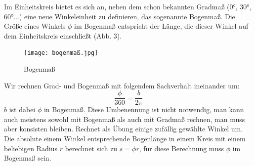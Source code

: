 \documentclass[11pt]{article}
\begin{document}
Im Einheitskreis bietet es sich an, neben dem schon bekannten Gradmaß (0°, 30°, 60°...) eine neue Winkeleinheit zu definieren, das sogenannte Bogenmaß. Die Größe eines Winkels $\phi$ im Bogenmaß entspricht der Länge, die dieser Winkel auf dem Einheitskreis einschließt (Abb. 3). 
\begin{figure}[ht]
    \texttt{[image: bogenmaß.jpg]}
    \centering
    \caption{Bogenmaß}
\end{figure} 
Wir rechnen Grad- und Bogenmaß mit folgendem Sachverhalt ineinander um: 
$$ \frac{\phi}{360} = \frac{b}{2\pi} $$
$b$ ist dabei $\phi$ in Bogenmaß. Diese Umbenennung ist nicht notwendig, man kann auch meistens sowohl mit Bogenmaß als auch mit Gradmaß rechnen, man muss aber konsisten bleiben. Rechnet als Übung einige zufällig gewählte Winkel um. \\
Die absolute einem Winkel entsprechende Bogenlänge in einem Kreis mit einem beliebigen Radius $r$ berechnet sich zu $s = \phi r$, für diese Berechnung muss $\phi$ im Bogenmaß sein.
\end{document}
